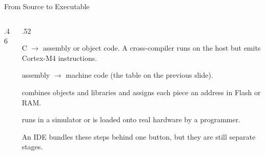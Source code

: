 \documentclass[9pt,aspectratio=169,xcolor=table]{beamer}
\begin{document}
\begin{frame}{From Source to Executable}
\begin{columns}[c]
\begin{column}{.46\textwidth}
{
        }
    \end{column}
    \begin{column}{.52\textwidth}
        {\small
        \begin{description}\itemsep3pt
            \item[Compiler] C $\rightarrow$ assembly or object code. A \alert{cross-compiler} runs on the host but emits Cortex-M4 instructions.
            \item[Assembler] assembly $\rightarrow$ machine code (the table on the previous slide).
            \item[Linker] combines objects and libraries and \alert{assigns each piece an address} in Flash or RAM.
            \item[Executable] runs in a \alert{simulator} or is loaded onto \alert{real hardware} by a programmer.
        \end{description}}
        \vspace{1mm}
        {\footnotesize An IDE bundles these steps behind one button, but they are still separate stages.}
    \end{column}
    \end{columns}
\end{frame}
\end{document}
